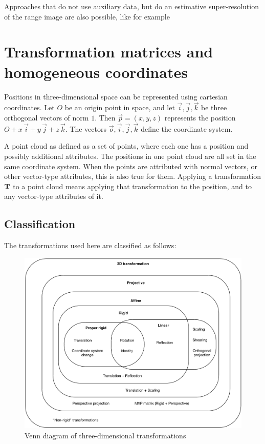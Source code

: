 Approaches that do not use auxiliary data, but do an estimative super-resolution of the range image are also possible, like for example \cite{Do2012}

\section{Transformation matrices and homogeneous coordinates}
Positions in three-dimensional space can be represented using cartesian coordinates. Let $O$ be an origin point in space, and let $\vec{i}, \vec{j}, \vec{k}$ be three orthogonal vectors of norm $1$. Then $\vec{p} = (x, y, z)$ represents the position $O + x \, \vec{i} + y \, \vec{j} + z \, \vec{k}$. The vectors $\vec{o}, \vec{i}, \vec{j}, \vec{k}$ define the coordinate system.

A point cloud as defined as a set of points, where each one has a position and possibly additional attributes. The positions in one point cloud are all set in the same coordinate system. When the points are attributed with normal vectors, or other vector-type attributes, this is also true for them. Applying a transformation $\mathbf{T}$ to a point cloud means applying that transformation to the position, and to any vector-type attributes of it.

\subsection{Classification}
The transformations used here are classified as follows:

\begin{figure}[h]
\center
\includegraphics[width=.8\textwidth]{fig/transformations_venn.pdf}
\caption{Venn diagram of three-dimensional transformations}
\end{figure}


